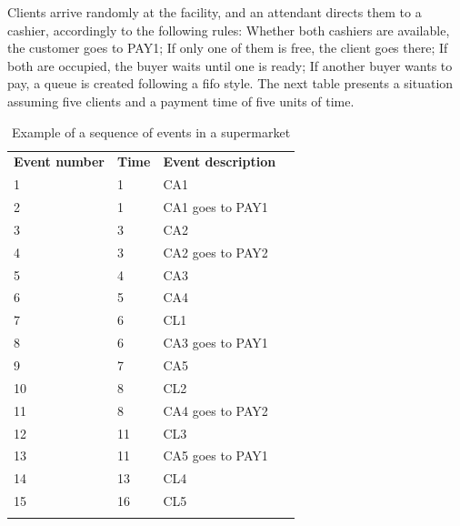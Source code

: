 Clients arrive randomly at the facility, and an attendant directs them to a cashier, accordingly to the following rules: Whether both cashiers are available, the customer goes to PAY1; If only one of them is free, the client goes there; If both are occupied, the buyer waits until one is ready; If another buyer wants to pay, a queue is created following a \gls{fifo} style. The next table presents a situation assuming five clients and a payment time of five units of time. 

\begin{table}[H]
\centering
\begin{tabular}{llll}
\cline{1-3}
\multicolumn{1}{|l|}{\cellcolor[HTML]{9B9B9B}\textbf{Event number}} & \multicolumn{1}{l|}{\cellcolor[HTML]{9B9B9B}\textbf{Time}} & \multicolumn{1}{l|}{\cellcolor[HTML]{9B9B9B}\textbf{Event description}} &  \\ \cline{1-3}
\multicolumn{1}{|l|}{1} & \multicolumn{1}{l|}{1} & \multicolumn{1}{l|}{CA1} &  \\ \cline{1-3}
\multicolumn{1}{|l|}{2} & \multicolumn{1}{l|}{1} & \multicolumn{1}{l|}{CA1 goes to PAY1} &  \\ \cline{1-3}
\multicolumn{1}{|l|}{3} & \multicolumn{1}{l|}{3} & \multicolumn{1}{l|}{CA2} &  \\ \cline{1-3}
\multicolumn{1}{|l|}{4} & \multicolumn{1}{l|}{3} & \multicolumn{1}{l|}{CA2 goes to PAY2} &  \\ \cline{1-3}
\multicolumn{1}{|l|}{5} & \multicolumn{1}{l|}{4} & \multicolumn{1}{l|}{CA3} &  \\ \cline{1-3}
\multicolumn{1}{|l|}{6} & \multicolumn{1}{l|}{5} & \multicolumn{1}{l|}{CA4} &  \\ \cline{1-3}
\multicolumn{1}{|l|}{7} & \multicolumn{1}{l|}{6} & \multicolumn{1}{l|}{CL1} &  \\ \cline{1-3}
\multicolumn{1}{|l|}{8} & \multicolumn{1}{l|}{6} & \multicolumn{1}{l|}{CA3 goes to PAY1} &  \\ \cline{1-3}
\multicolumn{1}{|l|}{9} & \multicolumn{1}{l|}{7} & \multicolumn{1}{l|}{CA5} &  \\ \cline{1-3}
\multicolumn{1}{|l|}{10} & \multicolumn{1}{l|}{8} & \multicolumn{1}{l|}{CL2} &  \\ \cline{1-3}
\multicolumn{1}{|l|}{11} & \multicolumn{1}{l|}{8} & \multicolumn{1}{l|}{CA4 goes to PAY2} &  \\ \cline{1-3}
\multicolumn{1}{|l|}{12} & \multicolumn{1}{l|}{11} & \multicolumn{1}{l|}{CL3} &  \\ \cline{1-3}
\multicolumn{1}{|l|}{13} & \multicolumn{1}{l|}{11} & \multicolumn{1}{l|}{CA5 goes to PAY1} &  \\ \cline{1-3}
\multicolumn{1}{|l|}{14} & \multicolumn{1}{l|}{13} & \multicolumn{1}{l|}{CL4} &  \\ \cline{1-3}
\multicolumn{1}{|l|}{15} & \multicolumn{1}{l|}{16} & \multicolumn{1}{l|}{CL5} &  \\ \cline{1-3}
 &  &  & 
\end{tabular}
\caption{Example of a sequence of events in a supermarket}
\label{tab_DESexample}
\end{table}

